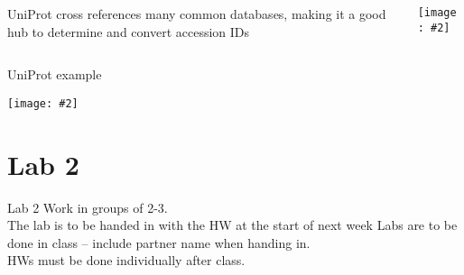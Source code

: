 \documentclass{beamer}
\renewcommand{\c}[1]{\begin{center}#1\end{center}}
\newcommand{\gr}[2][.95]{\c{\texttt{[image: \#2]}}}
\begin{document}
\begin{frame}
\begin{columns}
\begin{column}{0.5\textwidth}
    UniProt cross references many common databases, making it a good hub to determine and convert accession IDs
\end{column}
\begin{column}{0.5\textwidth}
    \gr{l2_figs/s32_crossref.png}
\end{column}
\end{columns}
\end{frame}

\begin{frame}{UniProt example}
\gr{l2_figs/s33_uniprot_example.png}
\end{frame}

\section{Lab 2}

\begin{frame}{Lab 2}
Work in groups of 2-3.\\
\bigskip
The lab is to be handed in with the HW at the start of next week
Labs are to be done in class – include partner name when handing in.\\
\bigskip
HWs must be done individually after class.
\end{frame}
\end{document}
